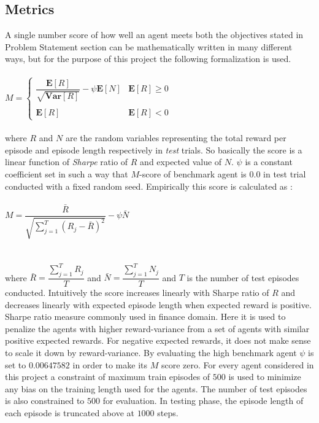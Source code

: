 \documentclass{article}
\begin{document}
\subsection*{Metrics}
A single number score of how well an agent meets both the objectives stated in Problem Statement section can be mathematically written in many different ways, but for the purpose of this project the following formalization is used.\\\\
$M = \begin{cases} \dfrac{\mathbf{E}[R]}{\sqrt{\mathbf{Var}[R]}} - \psi \mathbf{E}[N] & \mathbf{E}[R] \ge 0\\\\
 \mathbf{E}[R] & \mathbf{E}[R] < 0 \end{cases}$\\\\
where $R$ and $N$ are the random variables representing the total reward per episode and episode length respectively in \textit{test} trials. So basically the score is a linear function of \textit{Sharpe} ratio of $R$ and expected value of $N$. $\psi$ is a constant coefficient set in such a way that $M$-score of benchmark agent is 0.0 in test trial conducted with a fixed random seed. Empirically this score is calculated as :\\\\
$M = \dfrac{\bar{R}}{\sqrt{\sum_{j=1}^{T} \left( R_j - \bar{R}\right)^2}} - \psi \bar{N}$\\\\\\
where $\bar{R} = \dfrac{\sum_{j=1}^{T} R_j}{T}$ and $\bar{N} = \dfrac{\sum_{j=1}^{T} N_j}{T}$ and $T$ is the number of test episodes conducted. Intuitively the score increases linearly with Sharpe ratio of $R$ and decreases linearly with expected episode length when expected reward is positive. Sharpe ratio measure commonly used in finance domain. Here it is used to penalize the agents with higher reward-variance from a set of agents with similar positive expected rewards. For negative expected rewards, it does not make sense to scale it down by reward-variance.
By evaluating the high benchmark agent $\psi$ is set to $0.00647582$ in order to make its $M$ score zero. For every agent considered in this project a constraint of maximum train episodes of $500$ is used to minimize any bias on the training length used for the agents. The number of test episodes is also constrained to $500$ for evaluation. In testing phase, the episode length of each episode is truncated above at $1000$ steps.
\end{document}
